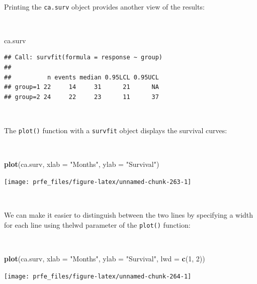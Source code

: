 \documentclass[12pt,a4paper]{book}
\newenvironment{Shaded}{\begin{snugshade}}{\end{snugshade}}
\newcommand{\KeywordTok}[1]{\textcolor[rgb]{0.13,0.29,0.53}{\textbf{#1}}}
\newcommand{\DataTypeTok}[1]{\textcolor[rgb]{0.13,0.29,0.53}{#1}}
\newcommand{\DecValTok}[1]{\textcolor[rgb]{0.00,0.00,0.81}{#1}}
\newcommand{\StringTok}[1]{\textcolor[rgb]{0.31,0.60,0.02}{#1}}
\newcommand{\NormalTok}[1]{#1}
\theoremstyle{definition}
\theoremstyle{definition}
\theoremstyle{definition}
\theoremstyle{remark}
\begin{document}
~

Printing the \texttt{ca.surv} object provides another view of the
results:

~

\begin{Shaded}
\begin{Highlighting}[]
\NormalTok{ca.surv}
\end{Highlighting}
\end{Shaded}

\begin{verbatim}
## Call: survfit(formula = response ~ group)
## 
##          n events median 0.95LCL 0.95UCL
## group=1 22     14     31      21      NA
## group=2 24     22     23      11      37
\end{verbatim}

~

The \texttt{plot()} function with a \texttt{survfit} object displays the
survival curves:

~

\begin{Shaded}
\begin{Highlighting}[]
\KeywordTok{plot}\NormalTok{(ca.surv, }\DataTypeTok{xlab =} \StringTok{"Months"}\NormalTok{, }\DataTypeTok{ylab =} \StringTok{"Survival"}\NormalTok{)}
\end{Highlighting}
\end{Shaded}

\begin{center}\texttt{[image: prfe\_files/figure-latex/unnamed-chunk-263-1]} \end{center}

~

We can make it easier to distinguish between the two lines by specifying
a width for each line using thelwd parameter of the \texttt{plot()}
function:

~

\begin{Shaded}
\begin{Highlighting}[]
\KeywordTok{plot}\NormalTok{(ca.surv, }\DataTypeTok{xlab =} \StringTok{"Months"}\NormalTok{, }\DataTypeTok{ylab =} \StringTok{"Survival"}\NormalTok{, }\DataTypeTok{lwd =} \KeywordTok{c}\NormalTok{(}\DecValTok{1}\NormalTok{, }\DecValTok{2}\NormalTok{))}
\end{Highlighting}
\end{Shaded}

\begin{center}\texttt{[image: prfe\_files/figure-latex/unnamed-chunk-264-1]} \end{center}
\end{document}
